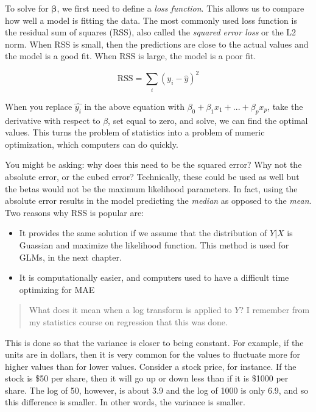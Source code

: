 \documentclass[
  openany]{book}
\providecommand{\tightlist}{%
  \setlength{\itemsep}{0pt}\setlength{\parskip}{0pt}}
\begin{document}
To solve for \(\mathbf{\beta}\), we first need to define a \emph{loss function}. This allows us to compare how well a model is fitting the data. The most commonly used loss function is the residual sum of squares (RSS), also called the \emph{squared error loss} or the L2 norm. When RSS is small, then the predictions are close to the actual values and the model is a good fit. When RSS is large, the model is a poor fit.

\[
\text{RSS} = \sum_i(y_i - \hat{y})^2
\]

When you replace \(\hat{y_i}\) in the above equation with \(\beta_0 + \beta_1 x_1 + ... + \beta_p x_p\), take the derivative with respect to \(\beta\), set equal to zero, and solve, we can find the optimal values. This turns the problem of statistics into a problem of numeric optimization, which computers can do quickly.

You might be asking: why does this need to be the squared error? Why not the absolute error, or the cubed error? Technically, these could be used as well but the betas would not be the maximum likelihood parameters. In fact, using the absolute error results in the model predicting the \emph{median} as opposed to the \emph{mean}. Two reasons why RSS is popular are:

\begin{itemize}
\tightlist
\item
  It provides the same solution if we assume that the distribution of \(Y|X\) is Guassian and maximize the likelihood function. This method is used for GLMs, in the next chapter.
\item
  It is computationally easier, and computers used to have a difficult time optimizing for MAE
\end{itemize}

\begin{quote}
What does it mean when a log transform is applied to \(Y\)? I remember from my statistics course on regression that this was done.
\end{quote}

This is done so that the variance is closer to being constant. For example, if the units are in dollars, then it is very common for the values to fluctuate more for higher values than for lower values. Consider a stock price, for instance. If the stock is \$50 per share, then it will go up or down less than if it is \$1000 per share. The log of 50, however, is about 3.9 and the log of 1000 is only 6.9, and so this difference is smaller. In other words, the variance is smaller.
\end{document}
